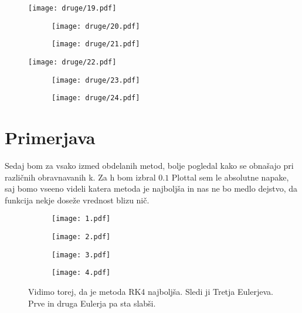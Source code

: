 \documentclass{article}
\begin{document}
\begin{figure}[H]
\texttt{[image: druge/19.pdf]}
\end{figure}
\begin{figure}[H]
\begin{subfigure}{.5\textwidth}
\texttt{[image: druge/20.pdf]}
\end{subfigure}
\begin{subfigure}{.5\textwidth}
\texttt{[image: druge/21.pdf]}
\end{subfigure}
\end{figure}

\begin{figure}[H]
\texttt{[image: druge/22.pdf]}
\end{figure}
\begin{figure}[H]
\begin{subfigure}{.5\textwidth}
\texttt{[image: druge/23.pdf]}
\end{subfigure}
\begin{subfigure}{.5\textwidth}
\texttt{[image: druge/24.pdf]}
\end{subfigure}
\end{figure}

\newpage

\section{Primerjava}

Sedaj bom za vsako izmed obdelanih metod, bolje pogledal kako se obnašajo pri različnih obravnavanih k. Za h bom izbral $0.1$ Plottal sem le absolutne napake, saj bomo vseeno videli katera metoda je najboljša in nas ne bo medlo dejstvo, da funkcija nekje doseže vrednost blizu nič.

\begin{figure}[H]
\begin{subfigure}{.5\textwidth}
\texttt{[image: 1.pdf]}
\end{subfigure}
\begin{subfigure}{.5\textwidth}
\texttt{[image: 2.pdf]}
\end{subfigure}
\end{figure}
\begin{figure}[H]
\begin{subfigure}{.5\textwidth}
\texttt{[image: 3.pdf]}
\end{subfigure}
\begin{subfigure}{.5\textwidth}
\texttt{[image: 4.pdf]}
\end{subfigure}
\caption*{Vidimo torej, da je metoda RK4 najboljša. Sledi ji Tretja Eulerjeva. Prve in druga Eulerja pa sta slabši. }
\end{figure}
\end{document}
